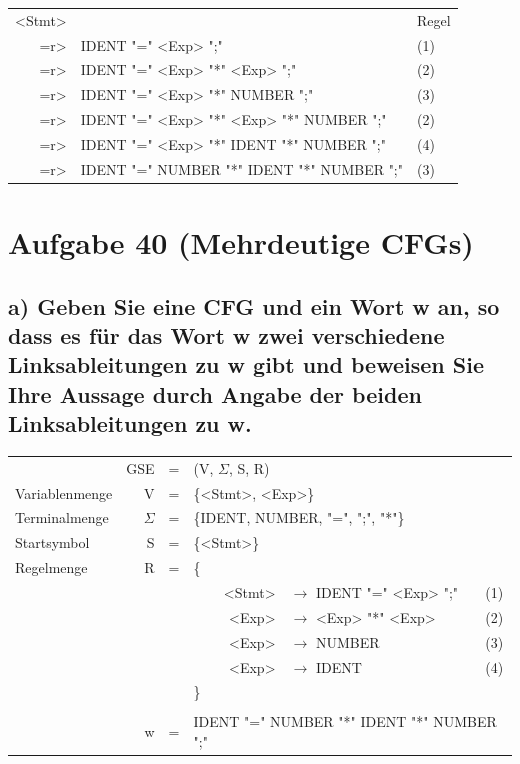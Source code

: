 \documentclass{article}
\begin{document}
\begin{center}
	\begin{tabular}{rll}
		<Stmt> & & Regel \\
		=r> & IDENT "=" <Exp> ";" & (1) \\
		=r> & IDENT "=" <Exp> "*" <Exp> ";" & (2)\\
		=r> & IDENT "=" <Exp> "*" NUMBER ";" & (3)\\
		=r> & IDENT "=" <Exp> "*" <Exp> "*" NUMBER ";" & (2)\\
		=r> & IDENT "=" <Exp> "*" IDENT "*" NUMBER ";" & (4)\\
		=r> & IDENT "=" NUMBER "*" IDENT "*" NUMBER ";" & (3)\\
	\end{tabular}
\end{center}


\section*{Aufgabe 40 (Mehrdeutige CFGs)}

\subsection*{a) Geben Sie eine CFG und ein Wort w an, so dass es für das Wort w zwei verschiedene Linksableitungen zu w gibt und beweisen Sie Ihre Aussage durch Angabe der beiden Linksableitungen zu w.}

\begin{center}
	\begin{tabular}{lrclrlc}
		& GSE & = & \multicolumn{4}{l}{(V, $\Sigma$, S, R)} \\
		Variablenmenge & V & = & \multicolumn{4}{l}{\{<Stmt>, <Exp>\}} \\
		Terminalmenge & $\Sigma$ & = & \multicolumn{4}{l}{\{IDENT, NUMBER, "=", ";", "*"\}} \\
		Startsymbol & S & = & \multicolumn{4}{l}{\{<Stmt>\}} \\
		Regelmenge & R & = & \{ \\
		& & & & <Stmt> & $\rightarrow$ IDENT "=" <Exp> ";" & (1) \\
		& & & & <Exp> & $\rightarrow$ <Exp> "*" <Exp> & (2) \\
		& & & & <Exp> & $\rightarrow$ NUMBER & (3) \\
		& & & & <Exp> & $\rightarrow$ IDENT & (4) \\
		& & & \} \\
		\\
		& w & = & \multicolumn{4}{l}{IDENT "=" NUMBER "*" IDENT "*" NUMBER ";"} \\
	\end{tabular}
\end{center}
\end{document}
